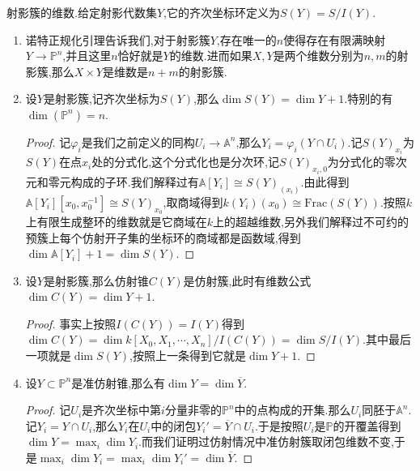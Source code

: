 射影簇的维数.给定射影代数集$Y$,它的齐次坐标环定义为$S(Y)=S/I(Y)$.
\begin{enumerate}
	\item 诺特正规化引理告诉我们,对于射影簇$Y$,存在唯一的$n$使得存在有限满映射$Y\to\mathbb{P}^n$,并且这里$n$恰好就是$Y$的维数.进而如果$X,Y$是两个维数分别为$n,m$的射影簇,那么$X\times Y$是维数是$n+m$的射影簇.
	\item 设$Y$是射影簇,记齐次坐标为$S(Y)$,那么$\dim S(Y)=\dim Y+1$.特别的有$\dim(\mathbb{P}^n)=n$.
	\begin{proof}
		
		记$\varphi_i$是我们之前定义的同构$U_i\to\mathbb{A}^n$,那么$Y_i=\varphi_i(Y\cap U_i)$.记$S(Y)_{x_i}$为$S(Y)$在点$x_i$处的分式化,这个分式化也是分次环,记$S(Y)_{x_i,0}$为分式化的零次元和零元构成的子环.我们解释过有$\mathbb{A}[Y_i]\cong S(Y)_{(x_i)}$.由此得到$\mathbb{A}[Y_i][x_0,x_0^{-1}]\cong S(Y)_{x_0}$,取商域得到$k(Y_i)(x_0)\cong\mathrm{Frac}(S(Y))$.按照$k$上有限生成整环的维数就是它商域在$k$上的超越维数,另外我们解释过不可约的预簇上每个仿射开子集的坐标环的商域都是函数域,得到$\dim\mathbb{A}[Y_i]+1=\dim S(Y)$.
	\end{proof}
	\item 设$Y$是射影簇,那么仿射锥$C(Y)$是仿射簇,此时有维数公式$\dim C(Y)=\dim Y+1$.
	\begin{proof}
		
		事实上按照$I(C(Y))=I(Y)$得到$\dim C(Y)=\dim k[X_0,X_1,\cdots,X_n]/I(C(Y))=\dim S/I(Y)$.其中最后一项就是$\dim S(Y)$,按照上一条得到它就是$\dim Y+1$.
	\end{proof}
	\item 设$Y\subset\mathbb{P}^n$是准仿射锥,那么有$\dim Y=\dim\overline{Y}$.
	\begin{proof}
		
		记$U_i$是齐次坐标中第$i$分量非零的$\mathbb{P}^n$中的点构成的开集.那么$U_i$同胚于$\mathbb{A}^n$.记$Y_i=Y\cap U_i$,那么$Y_i$在$U_i$中的闭包$Y_i'=\overline{Y}\cap U_i$.于是按照$U_i$是$\mathbb{P}$的开覆盖得到$\dim Y=\max_i\dim Y_i$.而我们证明过仿射情况中准仿射簇取闭包维数不变,于是$\max_i\dim Y_i=\max_i\dim Y_i'=\dim\overline{Y}$.
	\end{proof}
\end{enumerate}


